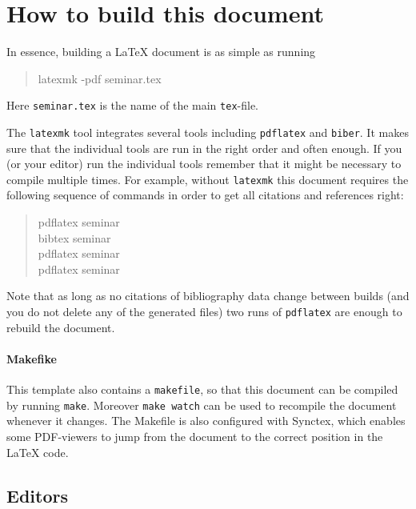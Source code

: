 \documentclass[]{rptuseminar}
\newenvironment{displayshellcommand}{%
	\begin{quote}%
	\ttfamily%
}{%
	\end{quote}%
}
\begin{document}
\section{How to build this document}
In essence, building a \LaTeX{} document is as simple as running
\begin{displayshellcommand}
	latexmk -pdf seminar.tex
\end{displayshellcommand}
Here \lstinline!seminar.tex! is the name of the main \texttt{tex}-file.

The \lstinline!latexmk! tool integrates several tools including \lstinline!pdflatex! and \lstinline!biber!.
It makes sure that the individual tools are run in the right order and often enough.
If you (or your editor) run the individual tools remember that it might be necessary to compile multiple times.
For example, without \lstinline!latexmk! this document requires the following sequence of commands in order to get all citations and references right:
\begin{displayshellcommand}
  pdflatex seminar \\
  bibtex    seminar \\
  pdflatex seminar \\
  pdflatex seminar
\end{displayshellcommand}
Note that as long as no citations of bibliography data change between builds (and you do not delete any of the generated files) two runs of \texttt{pdflatex} are enough to rebuild the document.

\paragraph{Makefike} This template also contains a \lstinline!makefile!, so that this document can be compiled by running \lstinline!make!.
Moreover \lstinline!make watch! can be used to recompile the document whenever it changes.
The Makefile is also configured with Synctex, which enables some PDF-viewers to jump from the document to the correct position in the \LaTeX{} code.

\subsection{Editors}
\label{sec:editors}
\end{document}
